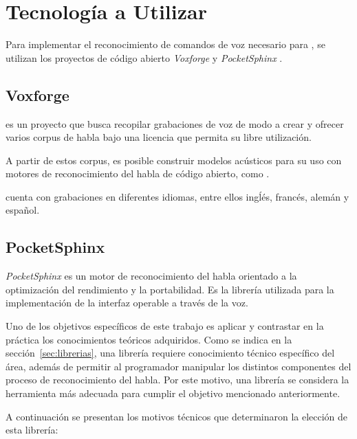\section{Tecnolog\'ia a Utilizar}
\label{sec:tecnologia-utilizada}
Para implementar el reconocimiento  de comandos de voz necesario para , 
se utilizan los proyectos de c\'odigo abierto \emph{Voxforge} \cite{Voxforge} y 
\emph{PocketSphinx} \cite{PocketSphinxHomePage}. 

\subsection{Voxforge}
\label{sec:voxforge-solucion}

 es un proyecto que busca recopilar grabaciones de voz de modo a crear 
y ofrecer varios corpus de habla bajo una licencia que permita su libre utilizaci\'on. 

A partir de estos corpus, es posible construir modelos ac\'usticos para su uso con motores de 
reconocimiento del habla de c\'odigo abierto, como .

 cuenta con grabaciones en diferentes idiomas, entre ellos ingĺ\'es, franc\'es, 
alem\'an y espa\~nol.


\subsection{PocketSphinx}
\label{sec:pocketsphinx-solucion}

\emph{PocketSphinx} es un motor de reconocimiento del habla orientado a la optimizaci\'on del 
rendimiento y la portabilidad. Es la librería utilizada para la implementaci\'on de la interfaz 
operable a trav\'es de la voz.

Uno de los objetivos espec\'ificos de este trabajo es aplicar y contrastar en la pr\'actica
los conocimientos te\'oricos adquiridos. Como se indica en la secci\'on~\ref{sec:librerias}, 
una librer\'ia requiere conocimiento t\'ecnico espec\'ifico del \'area, adem\'as de
permitir al programador manipular los distintos componentes del proceso de reconocimiento del habla.
Por este motivo, una librer\'ia se considera la herramienta m\'as adecuada para cumplir el objetivo
mencionado anteriormente.

A continuaci\'on se presentan los motivos t\'ecnicos que determinaron la elecci\'on de esta librer\'ia:

